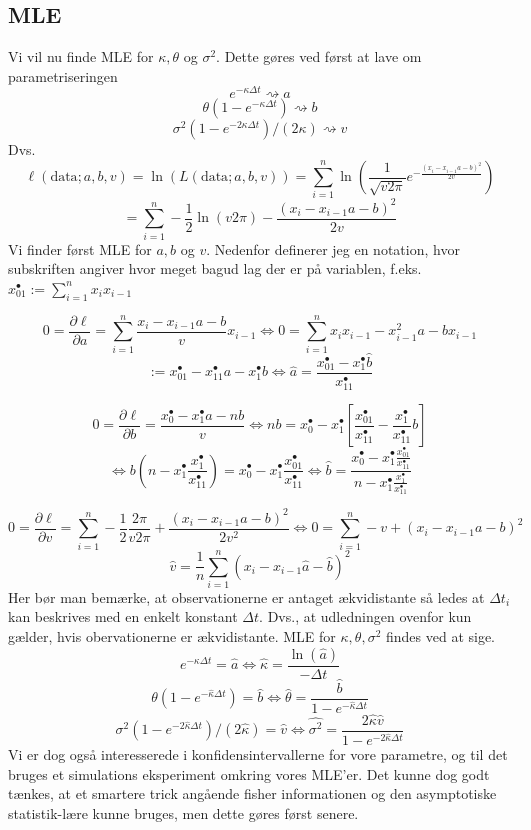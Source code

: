 \documentclass{article}
\theoremstyle{definition}
\theoremstyle{remark}
\newcommand\ens{\Leftrightarrow}
\begin{document}
\subsection{MLE}
Vi vil nu finde MLE for $\kappa, \theta$ og $\sigma^2$. Dette gøres ved først at lave om parametriseringen 
$$ e^{-\kappa\Delta t}\rightsquigarrow a$$
$$\theta(1-e^{-\kappa\Delta t})\rightsquigarrow b$$
$$\sigma^2(1-e^{-2\kappa\Delta t})/(2\kappa) \rightsquigarrow v$$
Dvs.
$$\ell(\text{data};a,b,v)=\ln(L(\text{data};a,b,v))=\sum_{i=1}^n \ln\left(\frac1{\sqrt{v2\pi}}e^{-\frac{(x_i-x_{i-1}a-b)^2}{2v}}\right)$$
$$=\sum_{i=1}^n-\frac12\ln(v2\pi)-\frac{(x_i-x_{i-1}a-b)^2}{2v}$$
Vi finder først MLE for $a,b$ og $v$. Nedenfor definerer jeg en notation, hvor subskriften angiver hvor meget bagud lag der er på variablen, f.eks. $x_{01}^\bullet:=\sum_{i=1}^nx_ix_{i-1}$

$$ 0=\frac{\partial \ell}{\partial a}=\sum_{i=1}^n\frac{x_i-x_{i-1}a-b}{v}x_{i-1}\ens0=\sum_{i=1}^n x_ix_{i-1}-x_{i-1}^2a-bx_{i-1}$$
$$:=x^\bullet_{01}-x^\bullet_{11}a-x^\bullet_1b\ens \hat a=\frac{x_{01}^\bullet-x^\bullet_1\hat b}{x^\bullet_{11}}$$

$$0=\frac{\partial \ell}{\partial b}=\frac{x^\bullet_0-x_1^\bullet a-nb}{v}\ens nb = x_0^\bullet-x_1^\bullet\left[ \frac{x_{01}^\bullet}{x_{11}^\bullet}-\frac{x_1^\bullet}{x_{11}^\bullet}b \right]$$
$$\ens b\left(n-x_1^\bullet\frac{x_1^\bullet}{x_{11}^\bullet}\right)=x_0^\bullet-x_1^\bullet\frac{x_{01}^\bullet}{x_{11}^\bullet}\ens \hat b = \frac{x_0^\bullet-x_1^\bullet\frac{x_{01}^\bullet}{x_{11}^\bullet}}{n-x_1^\bullet\frac{x_1^\bullet}{x_{11}^\bullet}}$$

$$0=\frac{\partial \ell}{\partial v}=\sum_{i=1}^n -\frac12\frac{2\pi}{v2\pi}+\frac{(x_i-x_{i-1}a-b)^2}{2v^2}\ens 0=\sum_{i=1}^n -v+(x_i-x_{i-1}a-b)^2$$
$$\hat v = \frac1n\sum_{i=1}^n(x_i-x_{i-1}\hat a-\hat b)^2$$
Her bør man bemærke, at observationerne er antaget ækvidistante så ledes at $\Delta t_i$ kan beskrives med en enkelt konstant $\Delta t$. Dvs., at udledningen ovenfor kun gælder, hvis obervationerne er ækvidistante. 
MLE for $\kappa,\theta,\sigma^2$ findes ved at sige.
$$e^{-\kappa\Delta t}=\hat a\ens \hat \kappa=\frac{\ln(\hat a)}{-\Delta t}$$
$$\theta(1-e^{-\hat \kappa \Delta t})=\hat b\ens \hat \theta =\frac{\hat b}{1-e^{-\hat \kappa\Delta t}}$$
$$\sigma^2(1-e^{-2\hat\kappa\Delta t})/(2\hat\kappa)=\hat v \ens \hat{\sigma^2}=\frac{2\hat\kappa\hat v}{1-e^{-2\hat\kappa\Delta t}}$$
Vi er dog også interesserede i  konfidensintervallerne for vore parametre, og til det bruges et simulations eksperiment omkring vores MLE'er. Det kunne dog godt tænkes, at et smartere trick angående fisher informationen og den asymptotiske statistik-lære kunne bruges, men dette gøres først senere.
\end{document}
